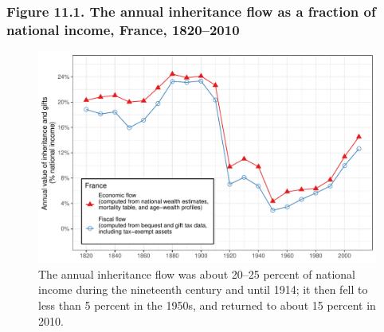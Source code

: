 \documentclass[t]{beamer}\usepackage[]{graphicx}\usepackage[]{color}
\newenvironment{knitrout}{}{} %
\begin{document}
\begin{frame}[label=Figure_11_1]
\frametitle{Figure 11.1. The annual inheritance flow as a fraction of national income, France, 1820--2010}
\begin{figure}[t]
\begin{minipage}[b]{\textwidth}
\centering
\begin{knitrout}\footnotesize
{}\color{fgcolor}

{\centering \includegraphics[width=1\linewidth]{figures/color/Figure_11_1} 

}



\end{knitrout}
\caption{The annual inheritance flow was about 20–25 percent of national income during the nineteenth century and until 1914; it then fell to less than 5 percent in the 1950s, and returned to about 15 percent in 2010.}
\end{minipage}
\end{figure}
\end{frame}
\end{document}
